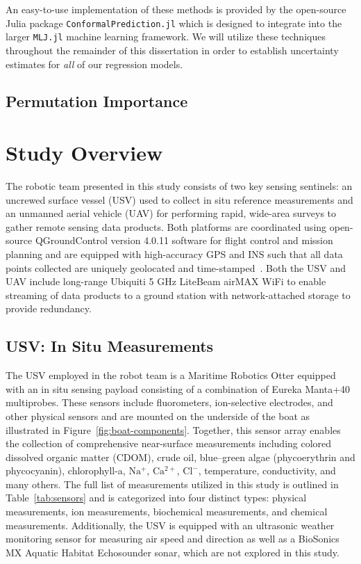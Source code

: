 An easy-to-use implementation of these methods is provided by the open-source
Julia package \texttt{ConformalPrediction.jl} which is designed to integrate
into the larger \texttt{MLJ.jl} machine learning framework. We will utilize
these techniques throughout the remainder of this dissertation in order to
establish uncertainty estimates for \textit{all} of our regression models.




\subsection{Permutation Importance}


\section{Study Overview}

 The robotic team presented in this study consists of two key sensing sentinels: an uncrewed surface vessel (USV) used to collect in situ reference measurements and an unmanned aerial vehicle (UAV) for performing rapid, wide-area surveys to gather remote sensing data products. Both platforms are coordinated using open-source QGroundControl version 4.0.11 software for flight control and mission planning and are equipped with high-accuracy GPS and INS such that all data points collected are uniquely geolocated and time-stamped~\cite{qgroundcontrol}. Both the USV and UAV include long-range Ubiquiti 5 GHz LiteBeam airMAX WiFi to enable streaming of data products to a ground station with network-attached storage to provide redundancy.

\subsection{USV: In Situ Measurements}

The USV employed in the robot team is a Maritime Robotics Otter equipped with an in situ sensing payload consisting of a combination of Eureka Manta+40 multiprobes. These sensors include fluorometers, ion-selective electrodes, and other physical sensors and are mounted on the underside of the boat as illustrated in Figure~\ref{fig:boat-components}. Together, this sensor array enables the collection of comprehensive near-surface measurements including colored dissolved organic matter (CDOM), crude oil, blue--green algae (phycoerythrin and phycocyanin), chlorophyll-a, $\mathrm{Na^+}$, $\mathrm{Ca^{2+}}$, $\mathrm{Cl^-}$, temperature, conductivity, and many others. The full list of measurements utilized in this study is outlined in Table~\ref{tab:sensors} and is categorized into four distinct types: physical measurements, ion measurements, biochemical measurements, and chemical measurements. Additionally, the USV is equipped with an ultrasonic weather monitoring sensor for measuring air speed and direction as well as a BioSonics MX Aquatic Habitat Echosounder sonar, which are not explored in this study.

